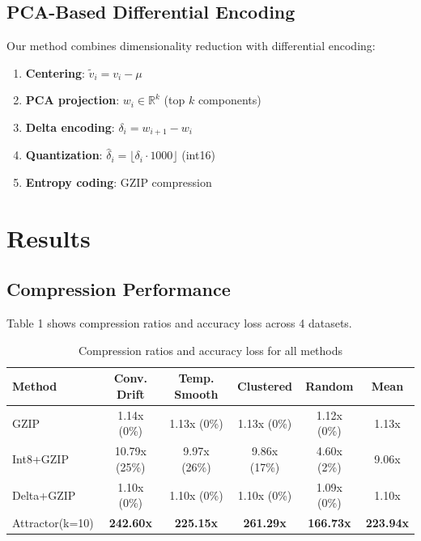 \documentclass[utf8]{FrontiersinVancouver}
\begin{document}
\subsection{PCA-Based Differential Encoding}

Our method combines dimensionality reduction with differential encoding:

\begin{enumerate}
\item \textbf{Centering}: $\tilde{v}_i = v_i - \mu$
\item \textbf{PCA projection}: $w_i \in \mathbb{R}^k$ (top $k$ components)
\item \textbf{Delta encoding}: $\delta_i = w_{i+1} - w_i$
\item \textbf{Quantization}: $\hat{\delta}_i = \lfloor \delta_i \cdot 1000 \rfloor$ (int16)
\item \textbf{Entropy coding}: GZIP compression
\end{enumerate}

\section{Results}

\subsection{Compression Performance}

Table 1 shows compression ratios and accuracy loss across 4 datasets.

\begin{table}[h]
\centering
\caption{Compression ratios and accuracy loss for all methods}
\small
\begin{tabular}{@{}lcccc|c@{}}
\toprule
\textbf{Method} & \textbf{Conv. Drift} & \textbf{Temp. Smooth} & \textbf{Clustered} & \textbf{Random} & \textbf{Mean} \\
\midrule
GZIP & 1.14x (0\%) & 1.13x (0\%) & 1.13x (0\%) & 1.12x (0\%) & 1.13x \\
Int8+GZIP & 10.79x (25\%) & 9.97x (26\%) & 9.86x (17\%) & 4.60x (2\%) & 9.06x \\
Delta+GZIP & 1.10x (0\%) & 1.10x (0\%) & 1.10x (0\%) & 1.09x (0\%) & 1.10x \\
Attractor(k=10) & \textbf{242.60x} & \textbf{225.15x} & \textbf{261.29x} & \textbf{166.73x} & \textbf{223.94x} \\
\bottomrule
\end{tabular}
\end{table}
\end{document}
